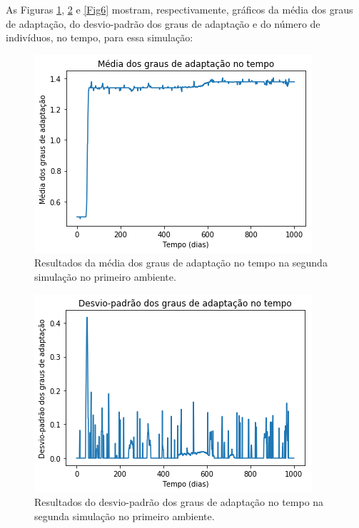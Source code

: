 \documentclass[10pt,brazil,english]{article}
\begin{document}
            As Figuras \ref{Fig4}, \ref{Fig5} e \ref{Fig6} mostram, respectivamente, gráficos da média dos graus de adaptação, do desvio-padrão dos graus de adaptação e do número de indivíduos, no tempo, para essa simulação:
            
            \begin{figure}[!hbtp]
                \begin{center}
                    \includegraphics[scale=0.5]{Images/1-4.png}
                \end{center}
                \caption{Resultados da média dos graus de adaptação no tempo na segunda simulação no primeiro ambiente.}
                \label{Fig4}
            \end{figure} 
            
            \begin{figure}[!hbtp]
                \begin{center}
                    \includegraphics[scale=0.5]{Images/1-5.png}
                \end{center}
                \caption{Resultados do desvio-padrão dos graus de adaptação no tempo na segunda simulação no primeiro ambiente.}
                \label{Fig5}
            \end{figure} 
            
\end{document}
